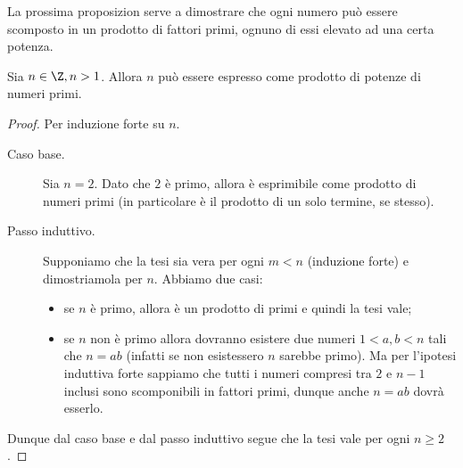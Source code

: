 La prossima proposizion serve a dimostrare che ogni numero può essere scomposto in un prodotto di fattori primi, ognuno di essi elevato ad una certa potenza.

\begin{proposition} 
    \label{esistenza_scomposizione_primi}
    Sia $n \in \Z, n > 1$. Allora $n$ può essere espresso come prodotto di potenze di numeri primi.
\end{proposition}
\begin{proof}
    Per induzione forte su $n$.
    \begin{description}
        \item[Caso base.]
        Sia $n = 2$. Dato che $2$ è primo, allora è esprimibile come prodotto di numeri primi (in particolare è il prodotto di un solo termine, se stesso).
        \item[Passo induttivo.]
        Supponiamo che la tesi sia vera per ogni $m < n$ (induzione forte) e dimostriamola per $n$.
        Abbiamo due casi:
        \begin{itemize}
            \item se $n$ è primo, allora è un prodotto di primi e quindi la tesi vale;
            \item se $n$ non è primo allora dovranno esistere due numeri $1 < a, b < n$ tali che $n = ab$ (infatti se non esistessero $n$ sarebbe primo). Ma per l'ipotesi induttiva forte sappiamo che tutti i numeri compresi tra $2$ e $n-1$ inclusi sono scomponibili in fattori primi, dunque anche $n = ab$ dovrà esserlo.
        \end{itemize}
    \end{description}
    Dunque dal caso base e dal passo induttivo segue che la tesi vale per ogni $n \geq 2$.
\end{proof}

